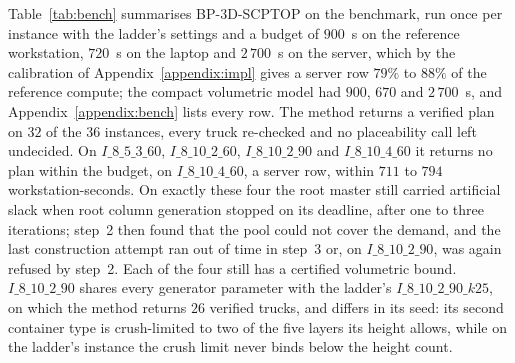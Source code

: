 

Table~\ref{tab:bench} summarises BP-3D-SCPTOP on the benchmark, run
once per instance with the ladder's settings and a budget of $900$~s on
the reference workstation, $720$~s on the laptop and $2\,700$~s on the
server, which by the calibration of Appendix~\ref{appendix:impl} gives
a server row $79\%$ to $88\%$ of the reference compute; the compact
volumetric model had $900$, $670$ and $2\,700$~s, and
Appendix~\ref{appendix:bench} lists every row. The method returns a
verified plan on $32$ of the $36$ instances, every truck re-checked
and no placeability call left undecided. On $I\_8\_5\_3\_60$,
$I\_8\_10\_2\_60$, $I\_8\_10\_2\_90$ and $I\_8\_10\_4\_60$ it returns
no plan within the budget, on $I\_8\_10\_4\_60$, a server row, within
$711$ to $794$ workstation-seconds. On exactly these four the root
master still carried artificial slack when root column generation
stopped on its deadline, after one to three iterations; step~2 then
found that the pool could not cover the demand, and the last
construction attempt ran out of time in step~3 or, on
$I\_8\_10\_2\_90$, was again refused by step~2. Each of the four
still has a certified volumetric bound. $I\_8\_10\_2\_90$ shares every
generator parameter with the ladder's $I\_8\_10\_2\_90\_k25$, on which
the method returns $26$ verified trucks, and differs in its seed: its
second container type is crush-limited to two of the five layers its
height allows, while on the ladder's instance the crush limit never
binds below the height count.

